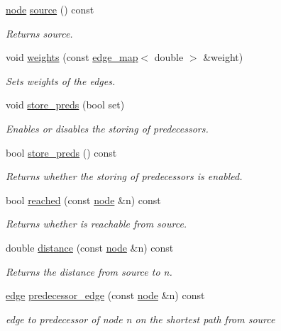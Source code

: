 \begin{DoxyCompactItemize}
\mbox{\hyperlink{classnode}{node}} \mbox{\hyperlink{classbellman__ford_a86e3fe7fe71d7569cc73e9e531d58539}{source}} () const
\begin{DoxyCompactList}\small\item\em Returns source. \end{DoxyCompactList}\item 
void \mbox{\hyperlink{classbellman__ford_a9e276cc9f30c2e608d320db4a08b2a74}{weights}} (const \mbox{\hyperlink{classedge__map}{edge\+\_\+map}}$<$ double $>$ \&weight)
\begin{DoxyCompactList}\small\item\em Sets weights of the edges. \end{DoxyCompactList}\item 
void \mbox{\hyperlink{classbellman__ford_aac87169a3cf4f95477ce215a0cb7a12b}{store\+\_\+preds}} (bool set)
\begin{DoxyCompactList}\small\item\em Enables or disables the storing of predecessors. \end{DoxyCompactList}\item 
bool \mbox{\hyperlink{classbellman__ford_a2ded0950bfaca6c3ee65a3617c1ccaa8}{store\+\_\+preds}} () const
\begin{DoxyCompactList}\small\item\em Returns whether the storing of predecessors is enabled. \end{DoxyCompactList}\item 
bool \mbox{\hyperlink{classbellman__ford_a93f7c34ec9662690230ca7a9c31933cd}{reached}} (const \mbox{\hyperlink{classnode}{node}} \&n) const
\begin{DoxyCompactList}\small\item\em Returns whether is reachable from source. \end{DoxyCompactList}\item 
double \mbox{\hyperlink{classbellman__ford_a881e5b021e69aced997185208438f910}{distance}} (const \mbox{\hyperlink{classnode}{node}} \&n) const
\begin{DoxyCompactList}\small\item\em Returns the distance from source to {\itshape n}. \end{DoxyCompactList}\item 
\mbox{\hyperlink{classedge}{edge}} \mbox{\hyperlink{classbellman__ford_a39f93b0b1e427cf26059fa6141c6f61c}{predecessor\+\_\+edge}} (const \mbox{\hyperlink{classnode}{node}} \&n) const
\begin{DoxyCompactList}\small\item\em edge to predecessor of node {\itshape n} on the shortest path from source \end{DoxyCompactList}\item 

\end{DoxyCompactItemize}
